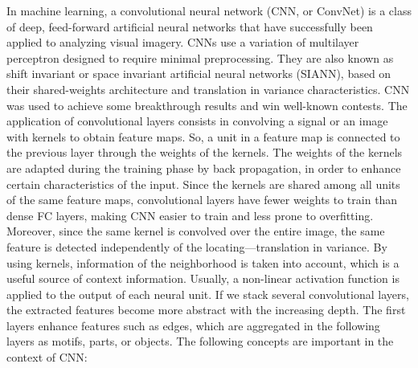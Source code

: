 In machine learning, a convolutional neural network (CNN, or ConvNet) is a class of deep, feed-forward artificial neural networks that have successfully been applied to analyzing visual imagery. CNNs use a variation of multilayer perceptron designed to require minimal preprocessing. They are also known as shift invariant or space invariant artificial neural networks (SIANN), based on their shared-weights architecture and translation in variance characteristics. CNN was used to achieve some breakthrough results and win well-known contests. The application of convolutional layers consists in convolving a signal or an image with kernels to obtain feature maps. So, a unit in a feature map is connected to the previous layer through the weights of the kernels. The weights of the kernels are adapted during the training phase by back propagation, in order to enhance certain characteristics of the input. Since the kernels are shared among all units of the same feature maps, convolutional layers have fewer weights to train than dense FC layers, making CNN easier to train and less prone to overfitting. Moreover, since the same kernel is convolved over the entire image, the same feature is detected independently of the locating—translation in variance. By using kernels, information of the neighborhood is taken into account, which is a useful source of context information. Usually, a non-linear activation function is applied to the output of each neural unit.
If we stack several convolutional layers, the extracted features become more abstract with the increasing depth. The first layers enhance features such as edges, which are aggregated in the following layers as motifs, parts, or objects. The following concepts are important in the context of CNN:


